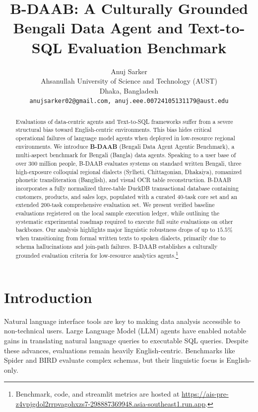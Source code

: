 \documentclass{article}
\title{\textbf{B-DAAB}: A Culturally Grounded Bengali Data Agent and Text-to-SQL Evaluation Benchmark}
\author{%
  Anuj Sarker \\
  Ahsanullah University of Science and Technology (AUST) \\
  Dhaka, Bangladesh \\
  \texttt{anujsarker02@gmail.com, anuj.eee.00724105131179@aust.edu} \\
}
\begin{document}
\maketitle

\begin{abstract}
Evaluations of data-centric agents and Text-to-SQL frameworks suffer from a severe structural bias toward English-centric environments. This bias hides critical operational failures of language model agents when deployed in low-resource regional environments. We introduce \textbf{B-DAAB} (Bengali Data Agent Agentic Benchmark), a multi-aspect benchmark for Bengali (Bangla) data agents. Speaking to a user base of over 300 million people, B-DAAB evaluates systems on standard written Bengali, three high-exposure colloquial regional dialects (Sylheti, Chittagonian, Dhakaiya), romanized phonetic transliteration (Banglish), and visual OCR table reconstruction. B-DAAB incorporates a fully normalized three-table DuckDB transactional database containing customers, products, and sales logs, populated with a curated 40-task core set and an extended 200-task comprehensive evaluation set. We present verified baseline evaluations registered on the local sample execution ledger, while outlining the systematic experimental roadmap required to execute full suite evaluations on other backbones. Our analysis highlights major linguistic robustness drops of up to $15.5\%$ when transitioning from formal written texts to spoken dialects, primarily due to schema hallucinations and join-path failures. B-DAAB establishes a culturally grounded evaluation criteria for low-resource analytics agents.\footnote{Benchmark, code, and streamlit metrics are hosted at \url{https://ais-pre-z4vpjgdol2rrpvagohxzs7-298887369948.asia-southeast1.run.app}.}
\end{abstract}

\section{Introduction}
Natural language interface tools are key to making data analysis accessible to non-technical users. Large Language Model (LLM) agents have enabled notable gains in translating natural language queries to executable SQL queries. Despite these advances, evaluations remain heavily English-centric. Benchmarks like Spider \cite{yu2018spider} and BIRD \cite{li2023bird} evaluate complex schemas, but their linguistic focus is English-only. 
\end{document}
